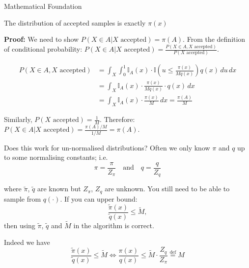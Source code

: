 \documentclass[aspectratio=169]{beamer}
\begin{document}
\begin{frame}{Mathematical Foundation}
	\begin{proposition}
		The distribution of accepted samples is exactly $\pi(x)$
	\end{proposition}
	\textbf{Proof:} We need to show $P(X \in A | X \text{ accepted}) = \pi(A)$. From the
	definition of conditional probability: $P(X \in A | X \text{ accepted}) = \frac{P(X \in A, X \text{ accepted})}{P(X \text{ accepted})}$.

	\begin{align*}
		P(X \in A, X \text{ accepted}) & = \int_X \int_0^1 \mathbb{I}_A(x) \cdot \mathbb{I}\left(u \leq \frac{\pi(x)}{M q(x)}\right) q(x) \, du \, dx \\
		                               & = \int_X \mathbb{I}_A(x) \cdot \frac{\pi(x)}{M q(x)} \cdot q(x) \, dx                                        \\
		                               & = \int_X \mathbb{I}_A(x) \cdot \frac{\pi(x)}{M} \, dx = \frac{\pi(A)}{M}
	\end{align*}

	Similarly, $P(X \text{ accepted}) = \frac{1}{M}$. Therefore: $P(X \in A | X \text{ accepted}) = \frac{\pi(A)/M}{1/M} = \pi(A)$.

\end{frame}

\begin{frame}{Does this work for un-normalised distributions?}
	Often we only know $\pi$ and $q$ up to some normalising constants; i.e.
	\begin{equation*}
		\pi = \frac{\pi}{Z_\pi} \quad \text{and} \quad q = \frac{q}{Z_q}
	\end{equation*}

	where $\tilde{\pi}$, $\tilde{q}$ are known but $Z_\pi$, $Z_q$ are unknown.
	You still need to be able to sample from $q(\cdot)$.
	If you can upper bound:
	\begin{equation*}
		\frac{\tilde{\pi}(x)}{\tilde{q}(x)} \leq \tilde{M},
	\end{equation*}
	then using $\tilde{\pi}$, $\tilde{q}$ and $\tilde{M}$ in the algorithm is correct.


	Indeed we have
	\begin{equation*}
		\frac{\tilde{\pi}(x)} {\tilde{q}(x)} \leq \tilde{M} \iff
		\frac{\pi(x)}{q(x)} \leq \tilde{M} \cdot \frac{Z_q}{Z_\pi} \overset{\text{def}}{=} M
	\end{equation*}

\end{frame}
\end{document}
